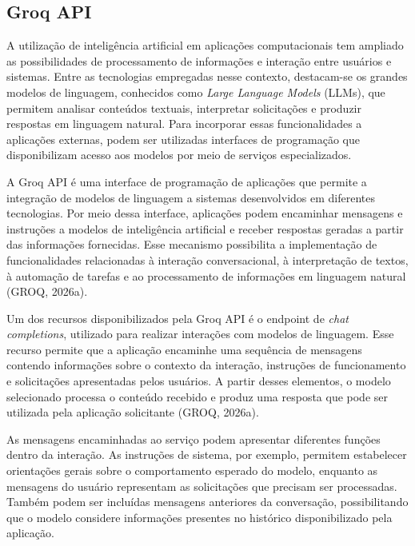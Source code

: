 
\subsection{Groq API}

A utilização de inteligência artificial em aplicações computacionais tem ampliado as possibilidades de processamento de informações e interação entre usuários e sistemas. Entre as tecnologias empregadas nesse contexto, destacam-se os grandes modelos de linguagem, conhecidos como \textit{Large Language Models} (LLMs), que permitem analisar conteúdos textuais, interpretar solicitações e produzir respostas em linguagem natural. Para incorporar essas funcionalidades a aplicações externas, podem ser utilizadas interfaces de programação que disponibilizam acesso aos modelos por meio de serviços especializados.

A Groq API é uma interface de programação de aplicações que permite a integração de modelos de linguagem a sistemas desenvolvidos em diferentes tecnologias. Por meio dessa interface, aplicações podem encaminhar mensagens e instruções a modelos de inteligência artificial e receber respostas geradas a partir das informações fornecidas. Esse mecanismo possibilita a implementação de funcionalidades relacionadas à interação conversacional, à interpretação de textos, à automação de tarefas e ao processamento de informações em linguagem natural (GROQ, 2026a).

Um dos recursos disponibilizados pela Groq API é o endpoint de \textit{chat completions}, utilizado para realizar interações com modelos de linguagem. Esse recurso permite que a aplicação encaminhe uma sequência de mensagens contendo informações sobre o contexto da interação, instruções de funcionamento e solicitações apresentadas pelos usuários. A partir desses elementos, o modelo selecionado processa o conteúdo recebido e produz uma resposta que pode ser utilizada pela aplicação solicitante (GROQ, 2026a).

As mensagens encaminhadas ao serviço podem apresentar diferentes funções dentro da interação. As instruções de sistema, por exemplo, permitem estabelecer orientações gerais sobre o comportamento esperado do modelo, enquanto as mensagens do usuário representam as solicitações que precisam ser processadas. Também podem ser incluídas mensagens anteriores da conversação, possibilitando que o modelo considere informações presentes no histórico disponibilizado pela aplicação.

